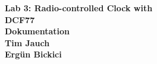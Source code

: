 \documentclass[a4paper,12pt]{article}
\begin{document}
\thispagestyle{empty}
\vspace*{3cm}
\begin{center}
    {\LARGE\textbf{Lab 3: Radio-controlled Clock with}}\\
    \vspace{0.3cm}
    {\LARGE\textbf{DCF77}}\\
    \vspace{1cm}
    {\LARGE\textbf{Dokumentation}}\\
    \vspace{3cm}
    \textbf{Tim Jauch}\\
    \vspace{0.5cm}
    \textbf{Ergün Bickici}
\end{center}



\newpage

\tableofcontents
\newpage

\listoffigures
\newpage

\listoftables
\newpage

\end{document}
